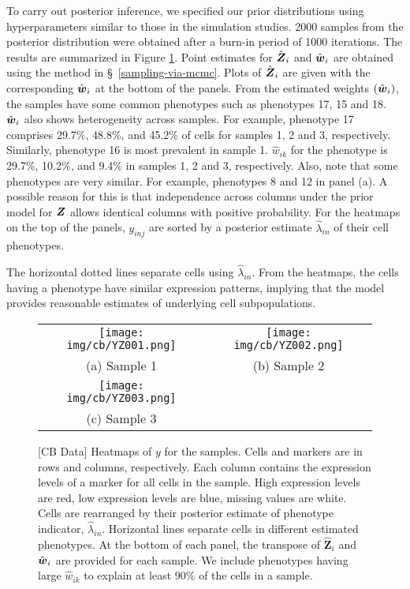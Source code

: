 \documentclass[12pt,]{article}
\def\Z{\bm{Z}}
\newcommand{\bZ}{\mbox{\boldmath $Z$}}
\newcommand{\bw}{\mbox{\boldmath $w$}}
\begin{document}
To carry out posterior inference, we specified our prior distributions using
hyperparameters similar to those in the simulation studies. 2000 samples from
the posterior distribution were obtained after a burn-in period of 1000
iterations. The results are summarized in Figure \ref{fig:cb-post-Z}.  Point
estimates for $\hat{\bZ}_i$ and $\hat{\bw}_i$ are obtained using the method in
\S~\ref{sampling-via-mcmc}.
Plots of $\hat{\bZ}_i$ are given with the corresponding $\hat{\bw}_i$ at the
bottom of the panels.  From the estimated weights $(\hat{\bw}_i)$, the samples
have some common phenotypes such as phenotypes 17, 15 and 18.
$\hat{\bw}_i$ also shows heterogeneity across samples.  For example, phenotype
17 comprises 29.7\%, 48.8\%, and 45.2\% of cells for samples 1, 2 and 3,
respectively.
%
Similarly, phenotype 16 is most prevalent in sample 1.  $\hat{w}_{ik}$ for the
phenotype is 29.7\%, 10.2\%, and 9.4\% in samples 1, 2 and 3, respectively.
%
Also, note that some phenotypes are very similar. For example, phenotypes 8 and
12 in panel (a).  A possible reason for this is that independence across
columns under the prior model for $\bZ$ allows identical columns with positive
probability.  For the heatmaps on the top of the panels, $y_{inj}$ are sorted
by a posterior estimate $\hat{\lambda}_{in}$ of their cell phenotypes.

The horizontal dotted lines separate cells using $\hat{\lambda}_{in}$.  From
the heatmaps, the cells having a phenotype have similar expression patterns,
implying that the model provides reasonable estimates of underlying cell
subpopulations.
\begin{figure}[th!]
\begin{center}
  \begin{tabular}{cc}
  \texttt{[image: img/cb/YZ001.png]}&
  \texttt{[image: img/cb/YZ002.png]}\\
  (a) Sample 1 & (b) Sample 2 \\
  \texttt{[image: img/cb/YZ003.png]} &\\
  (c) Sample 3 & \\
  \end{tabular}
\end{center}
\vspace{-0.05in}
\caption{[CB Data]  Heatmaps of $y$ for the samples. Cells and markers are in
rows and columns, respectively. Each column contains the expression levels of
a marker for all cells in the sample. High expression levels are red, low
expression levels are blue, missing values are white.   Cells are rearranged
by their posterior estimate of phenotype indicator, $\hat{\lambda}_{in}$.
Horizontal lines separate cells in different estimated phenotypes.
At the bottom of each panel, the transpose of $\hat{\Z}_i$
and $\hat{\bw}_i$ are provided for each sample. We include phenotypes having
large $\hat{w}_{ik}$ to explain at least 90\% of the cells in a sample.}
\label{fig:cb-post-Z}
\end{figure}
\end{document}
